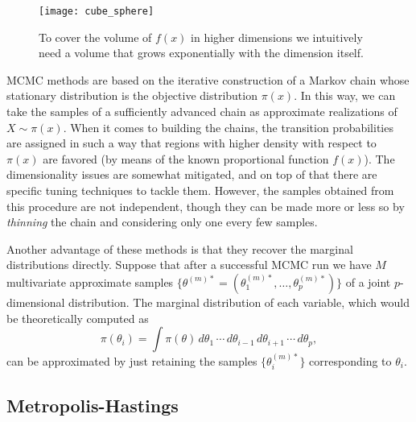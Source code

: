 \vspace{.1em}

\begin{figure}[htbp!]
  \centering
  \texttt{[image: cube\_sphere]}
  \caption{To cover the volume of \(f(x)\) in higher dimensions we intuitively need a volume that grows exponentially with the dimension itself.}\label{fig:curse_dimensionality}
\end{figure}

MCMC methods are based on the iterative construction of a Markov chain whose stationary distribution is the objective distribution \(\pi(x)\). In this way, we can take the samples of a sufficiently advanced chain as approximate realizations of \(X\sim \pi(x)\). When it comes to building the chains, the transition probabilities are assigned in such a way that regions with higher density with respect to \(\pi(x)\) are favored (by means of the known proportional function \(f(x)\)). The dimensionality issues are somewhat mitigated, and on top of that there are specific tuning techniques to tackle them. However, the samples obtained from this procedure are not independent, though they can be made more or less so by \textit{thinning} the chain and considering only one every few samples.

Another advantage of these methods is that they recover the marginal distributions directly. Suppose that after a successful MCMC run we have \(M\) multivariate approximate samples \(\{\theta^{(m)*}=(\theta_1^{(m)*},\dots, \theta_p^{(m)*})\}\) of a joint \(p\)-dimensional distribution. The marginal distribution of each variable, which would be theoretically computed as
\[
\pi(\theta_i) = \int \pi(\theta)\,d\theta_1\,\cdots\,d\theta_{i-1}\,d\theta_{i+1}\,\cdots \,d\theta_p,
\]
can be approximated by just retaining the samples \(\{\theta_i^{(m)*}\}\) corresponding to \(\theta_i\).

\subsection*{Metropolis-Hastings}

